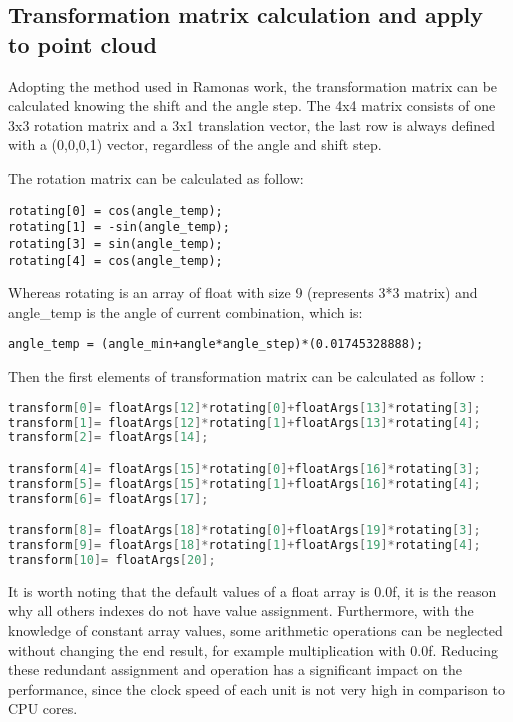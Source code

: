 \subsection{Transformation matrix calculation and apply to point cloud
}
Adopting the method used in Ramonas work, the transformation matrix can be calculated knowing the shift and the angle step. The 4x4  matrix consists of one 3x3 rotation matrix and a 3x1 translation vector, the last row is always defined with a (0,0,0,1) vector, regardless of the angle and shift step. 

The rotation matrix can be calculated as follow:

\begin{lstlisting}
rotating[0] = cos(angle_temp);
rotating[1] = -sin(angle_temp);
rotating[3] = sin(angle_temp);
rotating[4] = cos(angle_temp);
\end{lstlisting}

Whereas rotating is an array of float with size 9 (represents 3*3 matrix) and angle\_temp is the angle of current combination, which is:
\begin{lstlisting}
angle_temp = (angle_min+angle*angle_step)*(0.01745328888);
\end{lstlisting}
Then the first elements of transformation matrix can be calculated as follow :
\begin{lstlisting}[language=C]
transform[0]= floatArgs[12]*rotating[0]+floatArgs[13]*rotating[3];
transform[1]= floatArgs[12]*rotating[1]+floatArgs[13]*rotating[4];
transform[2]= floatArgs[14];

transform[4]= floatArgs[15]*rotating[0]+floatArgs[16]*rotating[3];
transform[5]= floatArgs[15]*rotating[1]+floatArgs[16]*rotating[4];
transform[6]= floatArgs[17];

transform[8]= floatArgs[18]*rotating[0]+floatArgs[19]*rotating[3];
transform[9]= floatArgs[18]*rotating[1]+floatArgs[19]*rotating[4];
transform[10]= floatArgs[20];
\end{lstlisting}

It is worth noting that the default values of a float array is 0.0f, it is the reason why all others indexes do not have value assignment. Furthermore, with the knowledge of constant array values, some arithmetic operations can be neglected without changing the end result, for example multiplication with 0.0f. Reducing these redundant assignment and operation has a significant impact on the performance, since the clock speed of each unit is not very high in comparison to CPU cores. 

